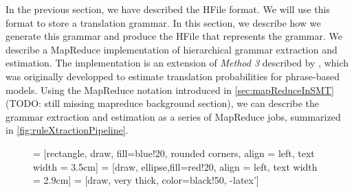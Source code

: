 In the previous section, we have described the HFile format. We will use
this format to store a translation grammar. In this
section, we describe how we generate this grammar and produce the HFile
that represents the grammar.
We describe a MapReduce implementation of hierarchical grammar
extraction and estimation. The implementation is an
extension of \emph{Method 3} described by
\citet{dyer-cordova-mont-lin:2008:WMT}, which was originally developped
to estimate translation probabilities for phrase-based models.
Using the MapReduce notation introduced
in \autoref{sec:mapReduceInSMT} (TODO: still missing mapreduce background section),
we can describe the grammar extraction and estimation
as a series of MapReduce jobs, summarized in
\autoref{fig:ruleXtractionPipeline}.
%
\begin{figure}
   = [rectangle, draw, fill=blue!20, rounded corners,
    align = left, text width = 3.5cm]
   = [draw, ellipse,fill=red!20,
    align = left, text width = 2.9cm]
   = [draw, very thick, color=black!50, -latex']


\end{figure}
